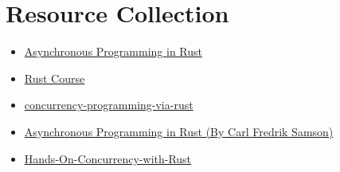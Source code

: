\section{Resource Collection}
\begin{itemize}
	\item \href{https://rust-lang.github.io/async-book/01_getting_started/01_chapter.html}
			   {Asynchronous Programming in Rust}
	\item \href{https://course.rs/advance/async/intro.html}
			   {Rust Course}
	\item \href{https://github.com/smallnest/concurrency-programming-via-rust}
			   {concurrency-programming-via-rust}
	\item \href{https://github.com/PacktPublishing/Asynchronous-Programming-in-Rust}
			   {Asynchronous Programming in Rust (By Carl Fredrik Samson)} 
	\item \href{https://github.com/PacktPublishing/Hands-On-Concurrency-with-Rust}
			   {Hands-On-Concurrency-with-Rust}
\end{itemize}

